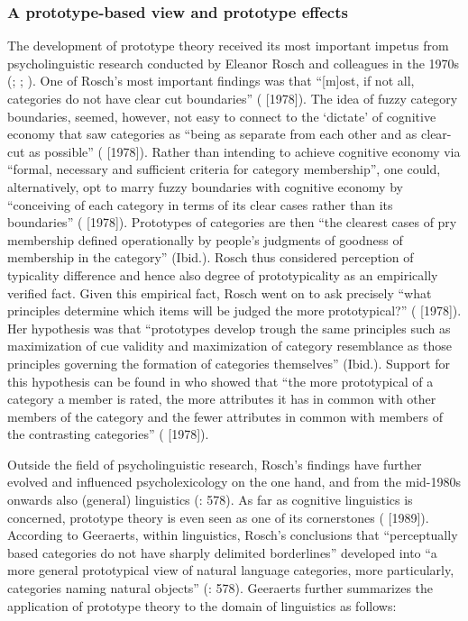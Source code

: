 \subsubsection{\label{sec:2.4.3.1}  A prototype-based view and prototype effects}

The development of prototype theory received its most important impetus from psycholinguistic research conducted by Eleanor Rosch and colleagues in the 1970s (\citealt{rosch_cognitive_1975}; \citealt{rosch_family_1975}; \citealt{Rosch1978}). One of Rosch’s most important findings was that “[m]ost, if not all, categories do not have clear cut boundaries” (\citealt[196]{margolis_principles_1999} [1978]). The idea of fuzzy category boundaries, seemed, however, not easy to connect to the ‘dictate’ of cognitive economy that saw categories as “being as separate from each other and as clear-cut as possible” (\citealt[196]{margolis_principles_1999} [1978]). Rather than intending to achieve cognitive economy via “formal, necessary and sufficient criteria for category membership”, one could, alternatively, opt to marry fuzzy boundaries with cognitive economy by “conceiving of each category in terms of its clear cases rather than its boundaries” (\citealt[196]{margolis_principles_1999} [1978]). Prototypes of categories are then “the clearest cases of pry membership defined operationally by people’s judgments of goodness of membership in the category” (Ibid.). Rosch thus considered perception of typicality difference and hence also degree of prototypicality as an empirically verified fact. Given this empirical fact, Rosch went on to ask precisely “what principles determine which items will be judged the more prototypical?” (\citealt[197]{margolis_principles_1999} [1978]). Her hypothesis was that “prototypes develop trough the same principles such as maximization of cue validity and maximization of category resemblance as those principles governing the formation of categories themselves” (Ibid.). Support for this hypothesis can be found in \citet{rosch_family_1975} who showed that “the more prototypical of a category a member is rated, the more attributes it has in common with other members of the category and the fewer attributes in common with members of the contrasting categories” (\citealt[197]{margolis_principles_1999} [1978]).



Outside the field of psycholinguistic research, Rosch’s findings have further evolved and influenced psycholexicology on the one hand, and from the mid-1980s onwards also (general) linguistics (\citealt{allan_lexical_2013}: 578). As far as cognitive linguistics is concerned, prototype theory is even seen as one of its cornerstones (\citealt[145]{Geeraerts2006}  [1989]). According to Geeraerts, within linguistics, Rosch’s conclusions that “perceptually based categories do not have sharply delimited borderlines” developed into “a more general prototypical view of natural language categories, more particularly, categories naming natural objects” (\citealt{allan_lexical_2013}: 578). Geeraerts further summarizes the application of prototype theory to the domain of linguistics as follows:



